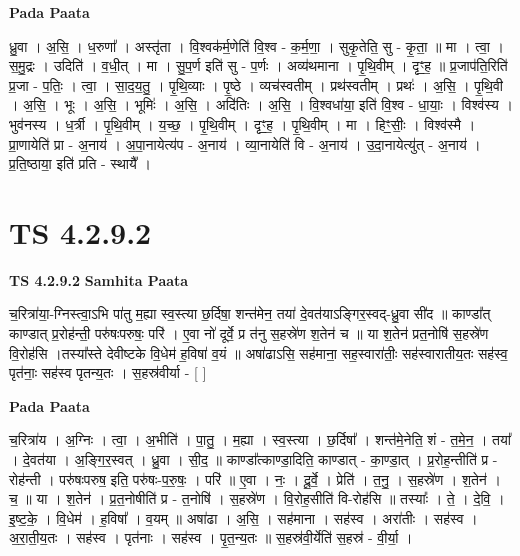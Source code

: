 \documentclass[17pt]{extarticle}
\begin{document}
\textbf{Pada Paata} \newline

ध्रु॒वा । अ॒सि॒ । ध॒रुणा᳚ । अस्तृ॑ता । वि॒श्वक॑र्म॒णेति॑ वि॒श्व - क॒र्म॒णा॒ । सुकृ॒तेति॒ सु - कृ॒ता॒ ॥ मा । त्वा॒ । स॒मु॒द्रः । उदिति॑ । व॒धी॒त् । मा । सु॒प॒र्ण इति॑ सु - प॒र्णः । अव्य॑थमाना । पृ॒थि॒वीम् । दृꣳ॒॒ह॒ ॥ प्र॒जाप॑ति॒रिति॑ प्र॒जा - प॒तिः॒ । त्वा॒ । सा॒द॒य॒तु॒ । पृ॒थि॒व्याः । पृ॒ष्ठे । व्यच॑स्वतीम् । प्रथ॑स्वतीम् । प्रथः॑ । अ॒सि॒ । पृ॒थि॒वी । अ॒सि॒ । भूः । अ॒सि॒ । भूमिः॑ । अ॒सि॒ । अदि॑तिः । अ॒सि॒ । वि॒श्वधा॑या॒ इति॑ वि॒श्व - धा॒याः॒ । विश्व॑स्य । भुव॑नस्य । ध॒र्त्री । पृ॒थि॒वीम् । य॒च्छ॒ । पृ॒थि॒वीम् । दृꣳ॒॒ह॒ । पृ॒थि॒वीम् । मा । हिꣳ॒॒सीः॒ । विश्व॑स्मै । प्रा॒णायेति॑ प्रा - अ॒नाय॑ । अ॒पा॒नायेत्य॑प - अ॒नाय॑ । व्या॒नायेति॑ वि - अ॒नाय॑ । उ॒दा॒नायेत्यु॑त् - अ॒नाय॑ । प्र॒ति॒ष्ठाया॒ इति॑ प्रति - स्थायै᳚ ।  \newline





\section{ TS 4.2.9.2 }

\textbf{TS 4.2.9.2 } \newline
\textbf{Samhita Paata} \newline

च॒रित्रा॑या॒-ग्निस्त्वा॒ऽभि पा॑तु म॒ह्या स्व॒स्त्या छ॒र्दिषा॒ शन्त॑मेन॒ तया॑ दे॒वत॑याऽङ्गिर॒स्वद्-ध्रु॒वा सी॑द ॥ काण्डा᳚त् काण्डात् प्र॒रोह॑न्ती॒ परु॑षःपरुषः॒ परि॑ । ए॒वा नो॑ दूर्वे॒ प्र त॑नु स॒हस्रे॑ण श॒तेन॑ च ॥ या श॒तेन॑ प्रत॒नोषि॑ स॒हस्रे॑ण वि॒रोह॑सि ।तस्या᳚स्ते देवीष्टके वि॒धेम॑ ह॒विषा॑ व॒यं ॥ अषा॑ढाऽसि॒ सह॑माना॒ सह॒स्वारा॑तीः॒ सह॑स्वारातीय॒तः सह॑स्व॒ पृत॑नाः॒ सह॑स्व पृतन्य॒तः । स॒हस्र॑वीर्या - [  ] \newline

\textbf{Pada Paata} \newline

च॒रित्रा॑य । अ॒ग्निः । त्वा॒ । अ॒भीति॑ । पा॒तु॒ । म॒ह्या । स्व॒स्त्या । छ॒र्दिषा᳚ । शन्त॑मे॒नेति॒ शं - त॒मे॒न॒ । तया᳚ । दे॒वत॑या । अ॒ङ्गि॒र॒स्वत् । ध्रु॒वा । सी॒द॒ ॥ काण्डा᳚त्काण्डा॒दिति॒ काण्डात् - का॒ण्डा॒त् । प्र॒रोह॒न्तीति॑ प्र - रोह॑न्ती । परु॑षःपरुष॒ इति॒ परु॑षः-प॒रु॒षः॒ । परि॑ ॥ ए॒वा । नः॒ । दू॒र्वे॒ । प्रेति॑ । त॒नु॒ । स॒हस्रे॑ण । श॒तेन॑ । च॒ ॥ या । श॒तेन॑ । प्र॒त॒नोषीति॑ प्र - त॒नोषि॑ । स॒हस्रे॑ण । वि॒रोह॒सीति॑ वि-रोह॑सि ॥ तस्याः᳚ । ते॒ । दे॒वि॒ । इ॒ष्ट॒के॒ । वि॒धेम॑ । ह॒विषा᳚ । व॒यम् ॥ अषा॑ढा । अ॒सि॒ । सह॑माना । सह॑स्व । अरा॑तीः । सह॑स्व । अ॒रा॒ती॒य॒तः । सह॑स्व । पृत॑नाः । सह॑स्व । पृ॒त॒न्य॒तः ॥ स॒हस्र॑वी॒र्येति॑ स॒हस्र॑ - वी॒र्या॒ ।  \newline
\end{document}
